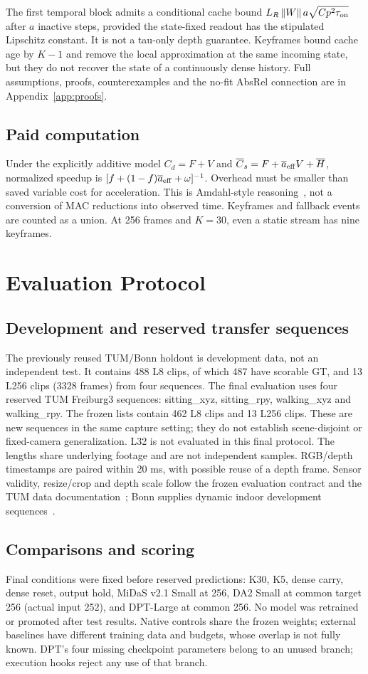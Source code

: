 \documentclass[mathematics,article,submit,moreauthors]{Definitions/mdpi}
\providecommand{\norm}[1]{\left\lVert#1\right\rVert}
\begin{document}
The first temporal block admits a conditional cache bound
$L_R\norm{W}a\sqrt{Cp^2\tau_{\rm on}}$ after $a$ inactive steps, provided the
state-fixed readout has the stipulated Lipschitz constant. It is not a tau-only
depth guarantee. Keyframes bound cache age by $K-1$ and remove the local approximation
at the same incoming state, but they do not recover the state of a continuously dense history.
Full assumptions, proofs, counterexamples and the no-fit AbsRel connection are in Appendix~\ref{app:proofs}.

\subsection{Paid computation}
Under the explicitly additive model $C_d=F+V$ and
$\overline C_s=F+\overline a_{\rm eff}V+\overline H$, normalized speedup is
$[f+(1-f)\overline a_{\rm eff}+\omega]^{-1}$. Overhead must be smaller than
saved variable cost for acceleration. This is Amdahl-style reasoning~\cite{amdahl1967},
not a conversion of MAC reductions into observed time. Keyframes and fallback events
are counted as a union. At 256 frames and $K=30$, even a static stream has nine keyframes.

\section{Evaluation Protocol}
\subsection{Development and reserved transfer sequences}
The previously reused TUM/Bonn holdout is development data, not an independent test.
It contains 488 L8 clips, of which 487 have scorable GT, and 13 L256 clips (3328 frames)
from four sequences. The final evaluation uses four reserved TUM Freiburg3 sequences:
sitting\_xyz, sitting\_rpy, walking\_xyz and walking\_rpy. The frozen lists contain
462 L8 clips and 13 L256 clips. These are new sequences in the same capture setting;
they do not establish scene-disjoint or fixed-camera generalization. L32 is not evaluated
in this final protocol. The lengths share underlying footage and are not independent samples.
RGB/depth timestamps are paired within 20 ms, with possible reuse of a depth frame.
Sensor validity, resize/crop and depth scale follow the frozen evaluation contract and
the TUM data documentation~\cite{tumdata}; Bonn supplies dynamic indoor development
sequences~\cite{bonndata}.

\subsection{Comparisons and scoring}
Final conditions were fixed before reserved predictions: K30, K5, dense carry, dense reset,
output hold, MiDaS v2.1 Small at 256, DA2 Small at common target 256 (actual input 252),
and DPT-Large at common 256. No model was retrained or promoted after test results.
Native controls share the frozen weights; external baselines have different training
data and budgets, whose overlap is not fully known. DPT's four missing checkpoint
parameters belong to an unused branch; execution hooks reject any use of that branch.
\end{document}
